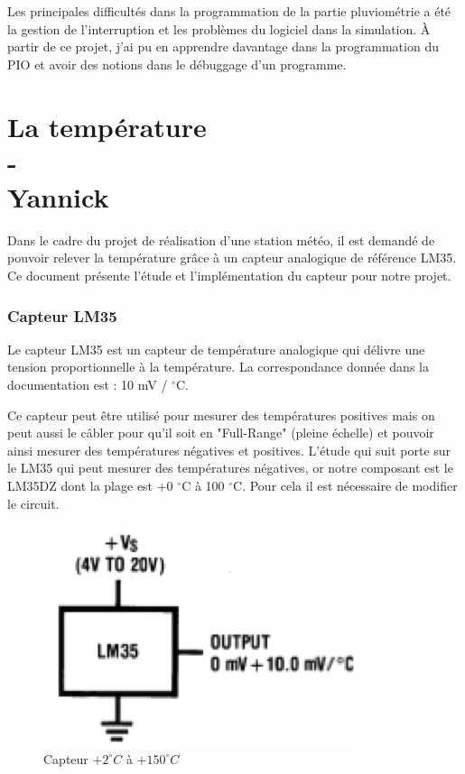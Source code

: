 \documentclass[a4paper]{report}
\begin{document}
Les principales difficultés dans la programmation de la partie pluviométrie a été la gestion de l’interruption et les problèmes du logiciel dans la simulation.
À partir de ce projet, j’ai pu en apprendre davantage dans la programmation du PIO et avoir des notions dans le débuggage d’un programme.

\part{La température\\-\\Yannick {}}
Dans le cadre du projet de réalisation d'une station météo, il est demandé de pouvoir relever la température grâce à un capteur analogique de référence LM35.
Ce document présente l'étude et l'implémentation du capteur pour notre projet.
\section{Capteur LM35}
Le capteur LM35 est un capteur de température analogique qui délivre une tension proportionnelle à la température. La correspondance donnée dans la documentation est : 10 mV / $^\circ$C.

Ce capteur peut être utilisé pour mesurer des températures positives mais on peut aussi le câbler pour qu'il soit en "Full-Range" (pleine échelle) et pouvoir ainsi mesurer des températures négatives et positives.  L'étude qui suit porte sur le LM35 qui peut mesurer des températures négatives, or notre composant est le LM35DZ dont la plage est +0 $^\circ$C à 100 $^\circ$C.
Pour cela il est nécessaire de modifier le circuit.

\begin{figure}[h!]
	\centering
	\includegraphics[scale=0.6]{images/TEMP_fig1.png}
	\caption{Capteur $+2^\circ C$ à $+150^\circ C$}
	\label{TEMP-fig1}
\end{figure}
\end{document}
